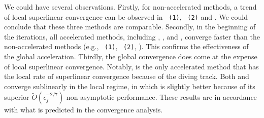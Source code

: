 \documentclass[moor,sglanonrev]{informs4}
\begin{document}
We could have several observations. Firstly, for non-accelerated methods, a trend of local superlinear convergence can be observed in \utr{}~\texttt{(1)}, \utr{}~\texttt{(2)} and \arc{}. We could conclude that these three methods are comparable.
Secondly, in the beginning of the iterations, all accelerated methods, including \atr{}, \atrms{}, and \arca{}, converge faster than the non-accelerated methods (e.g., \utr{}~\texttt{(1)}, \utr{}~\texttt{(2)}, \arc{}). This confirms the effectiveness of the global acceleration. Thirdly, the global convergence does come at the expense of local superlinear convergence.
Notably, \atr{} is the only accelerated method that has the local rate of superlinear convergence because of the diving track.
Both \atrms{} and \arca{} converge sublinearly in the local regime, in which \atrms{} is slightly better because of its superior $\tilde O(\epsilon_f^{-2/7})$ non-asymptotic performance. These results are in accordance with what is predicted in the convergence analysis. 


% 
% 

\end{document}
